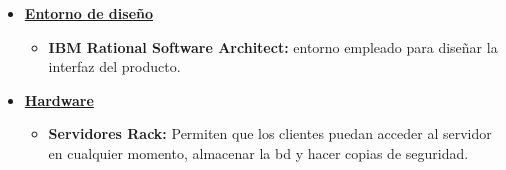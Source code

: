 \begin{itemize}
\begin{itemize}
	      \end{itemize}
	\item \textbf{\underline{Entorno de diseño}}
	      \begin{itemize}
		      \item\textbf{IBM Rational Software Architect:} entorno empleado para diseñar la interfaz del producto.
	      \end{itemize}
	\item \textbf{\underline{Hardware}}
	      \begin{itemize}
		      \item\textbf{Servidores Rack:} Permiten que los clientes puedan acceder al servidor en cualquier momento, almacenar la \gls{bd} y hacer copias de seguridad.
	      \end{itemize}
\end{itemize}
